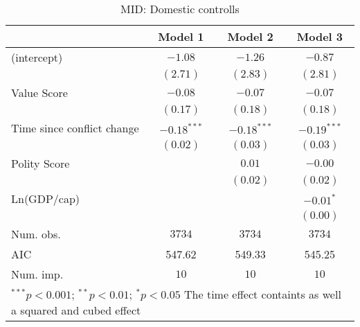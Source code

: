 
\begin{table}
\begin{center}
\begin{tabular}{l c c c}
\toprule
 & Model 1 & Model 2 & Model 3 \\
\midrule
(intercept)                & $-1.08$       & $-1.26$       & $-0.87$       \\
                           & $(2.71)$      & $(2.83)$      & $(2.81)$      \\
Value Score                & $-0.08$       & $-0.07$       & $-0.07$       \\
                           & $(0.17)$      & $(0.18)$      & $(0.18)$      \\
Time since conflict change & $-0.18^{***}$ & $-0.18^{***}$ & $-0.19^{***}$ \\
                           & $(0.02)$      & $(0.03)$      & $(0.03)$      \\
Polity Score               &               & $0.01$        & $-0.00$       \\
                           &               & $(0.02)$      & $(0.02)$      \\
Ln(GDP/cap)                &               &               & $-0.01^{*}$   \\
                           &               &               & $(0.00)$      \\
\midrule
Num. obs.                  & $3734$        & $3734$        & $3734$        \\
AIC                        & 547.62        & 549.33        & 545.25        \\
Num. imp.                  & $10$          & $10$          & $10$          \\
\bottomrule
\multicolumn{4}{l}{\scriptsize{$^{***}p<0.001$; $^{**}p<0.01$; $^{*}p<0.05$ 
 The time effect containts as well a squared and cubed effect}}
\end{tabular}
\caption{MID: Domestic controlls}
\label{MID_1}
\end{center}
\end{table}
